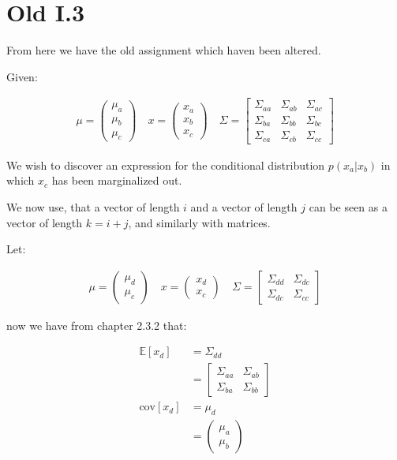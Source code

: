 \section*{Old I.3}

From here we have the old assignment which haven been altered.

Given:

\begin{align*}
	\mu = \begin{pmatrix}
		\mu_a \\
		\mu_b \\
		\mu_c
	\end{pmatrix} \quad
	x = \begin{pmatrix}
		x_a \\
		x_b \\
		x_c
	\end{pmatrix} \quad
	\Sigma = \begin{bmatrix}
		\Sigma_{aa} & \Sigma_{ab} & \Sigma_{ac} \\
		\Sigma_{ba} & \Sigma_{bb} & \Sigma_{bc} \\
		\Sigma_{ca} & \Sigma_{cb} & \Sigma_{cc}
	\end{bmatrix}
\end{align*}

We wish to discover an expression for the conditional distribution $p(x_a|x_b)$
in which $x_c$ has been marginalized out.

We now use, that a vector of length $i$ and a vector of length $j$
can be seen as a vector of length $k=i+j$, and similarly with matrices.

Let:

\begin{align*}
	\mu = \begin{pmatrix}
		\mu_d \\
		\mu_c
	\end{pmatrix} \quad
	x = \begin{pmatrix}
		x_d \\
		x_c
	\end{pmatrix} \quad
	\Sigma = \begin{bmatrix}
		\Sigma_{dd} & \Sigma_{dc} \\
		\Sigma_{dc} & \Sigma_{cc}
	\end{bmatrix}
\end{align*}

now we have from chapter 2.3.2 that:

\begin{align*}
	\mathbb{E}[x_d] &= \Sigma_{dd} \\
	&= \begin{bmatrix}
		\Sigma_{aa} & \Sigma_{ab} \\
		\Sigma_{ba} & \Sigma_{bb}
	   \end{bmatrix} \\
	\text{cov}[x_d] &= \mu_d \\
	&= \begin{pmatrix}
		\mu_a \\
		\mu_b
	   \end{pmatrix}
\end{align*}

